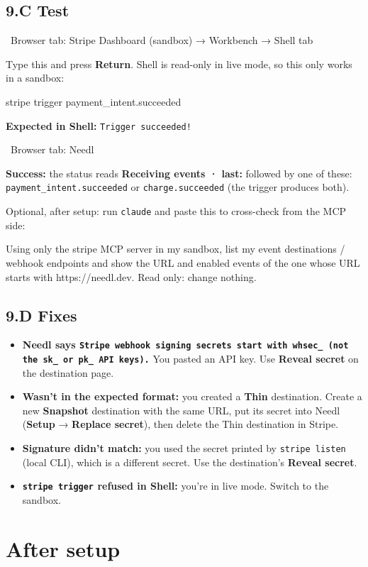 \documentclass[11pt,a4paper]{article}
\newcommand{\ui}[1]{\textbf{#1}}
\newcommand{\where}[1]{\par\smallskip\noindent\colorbox{winbg}{\color{winfg}\bfseries\strut\ #1\ }\par\nopagebreak[4]}
\newcommand{\lit}[1]{\texttt{#1}}
\newenvironment{prompt}{\def\FrameCommand{\fboxsep=6pt\fcolorbox{Gray}{okbg}}\MakeFramed{\advance\hsize-\width\FrameRestore}\raggedright}{\endMakeFramed}
\begin{document}
\subsection*{9.C Test}
\where{Browser tab: Stripe Dashboard (sandbox) → Workbench → Shell tab}
Type this and press \ui{Return}. Shell is read-only in live mode, so this only works in a sandbox:
\begin{cmd}
stripe trigger payment_intent.succeeded
\end{cmd}
\textbf{Expected in Shell:} \lit{Trigger succeeded!}
\where{Browser tab: Needl}
\textbf{Success:} the status reads \ui{Receiving events · last:} followed by one of these:\\
\lit{payment\_intent.succeeded} or \lit{charge.succeeded} (the trigger produces both).

Optional, after setup: run \lit{claude} and paste this to cross-check from the MCP side:
\begin{prompt}
Using only the stripe MCP server in my sandbox, list my event destinations / webhook endpoints and show the URL and enabled events of the one whose URL starts with https://needl.dev. Read only: change nothing.
\end{prompt}

\subsection*{9.D Fixes}
\begin{itemize}
\item \textbf{Needl says \lit{Stripe webhook signing secrets start with whsec\_ (not the sk\_ or pk\_ API keys).}} You pasted an API key. Use \ui{Reveal secret} on the destination page.
\item \textbf{Wasn't in the expected format:} you created a \ui{Thin} destination. Create a new \ui{Snapshot} destination with the same URL, put its secret into Needl (\ui{Setup} → \ui{Replace secret}), then delete the Thin destination in Stripe.
\item \textbf{Signature didn't match:} you used the secret printed by \lit{stripe listen} (local CLI), which is a different secret. Use the destination's \ui{Reveal secret}.
\item \textbf{\lit{stripe trigger} refused in Shell:} you're in live mode. Switch to the sandbox.
\end{itemize}

\clearpage
\section{After setup}
\end{document}
